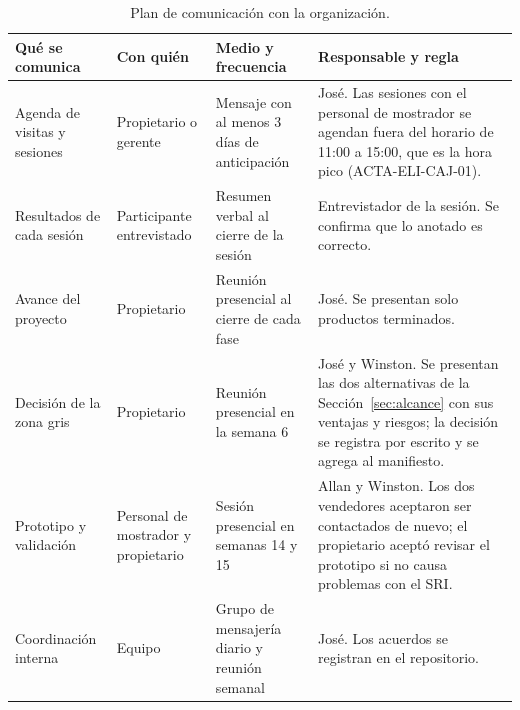 \begin{table}[H]
\centering
\caption{Plan de comunicación con la organización.}
\label{tab:comunicacion}
\small
\begin{tabularx}{\textwidth}{@{}L{3.4cm}L{2.5cm}L{2.6cm}X@{}}
\toprule
\textbf{Qué se comunica} & \textbf{Con quién} & \textbf{Medio y frecuencia} & \textbf{Responsable y regla} \\
\midrule
Agenda de visitas y sesiones & Propietario o gerente & Mensaje con al menos 3 días de anticipación & José. Las sesiones con el personal de mostrador se agendan fuera del horario de 11:00 a 15:00, que es la hora pico (ACTA-ELI-CAJ-01). \\
Resultados de cada sesión & Participante entrevistado & Resumen verbal al cierre de la sesión & Entrevistador de la sesión. Se confirma que lo anotado es correcto. \\
Avance del proyecto & Propietario & Reunión presencial al cierre de cada fase & José. Se presentan solo productos terminados. \\
Decisión de la zona gris & Propietario & Reunión presencial en la semana 6 & José y Winston. Se presentan las dos alternativas de la Sección~\ref{sec:alcance} con sus ventajas y riesgos; la decisión se registra por escrito y se agrega al manifiesto. \\
Prototipo y validación & Personal de mostrador y propietario & Sesión presencial en semanas 14 y 15 & Allan y Winston. Los dos vendedores aceptaron ser contactados de nuevo; el propietario aceptó revisar el prototipo si no causa problemas con el SRI. \\
Coordinación interna & Equipo & Grupo de mensajería diario y reunión semanal & José. Los acuerdos se registran en el repositorio. \\
\bottomrule
\end{tabularx}
\end{table}
